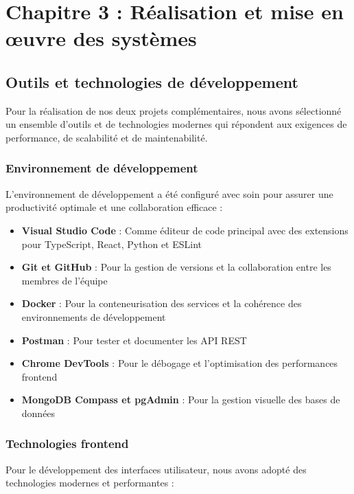 \chapter*{Chapitre 3 : Réalisation et mise en œuvre des systèmes}
\thispagestyle{fancy}
\setcounter{section}{0}
\newpage

\section{Outils et technologies de développement}
Pour la réalisation de nos deux projets complémentaires, nous avons sélectionné un ensemble d'outils et de technologies modernes qui répondent aux exigences de performance, de scalabilité et de maintenabilité.

\subsection{Environnement de développement}
L'environnement de développement a été configuré avec soin pour assurer une productivité optimale et une collaboration efficace :

\begin{itemize}
  \item \textbf{Visual Studio Code} : Comme éditeur de code principal avec des extensions pour TypeScript, React, Python et ESLint
  
  \item \textbf{Git et GitHub} : Pour la gestion de versions et la collaboration entre les membres de l'équipe
  
  \item \textbf{Docker} : Pour la conteneurisation des services et la cohérence des environnements de développement
  
  \item \textbf{Postman} : Pour tester et documenter les API REST
  
  \item \textbf{Chrome DevTools} : Pour le débogage et l'optimisation des performances frontend
  
  \item \textbf{MongoDB Compass et pgAdmin} : Pour la gestion visuelle des bases de données
\end{itemize}

\subsection{Technologies frontend}
Pour le développement des interfaces utilisateur, nous avons adopté des technologies modernes et performantes :

